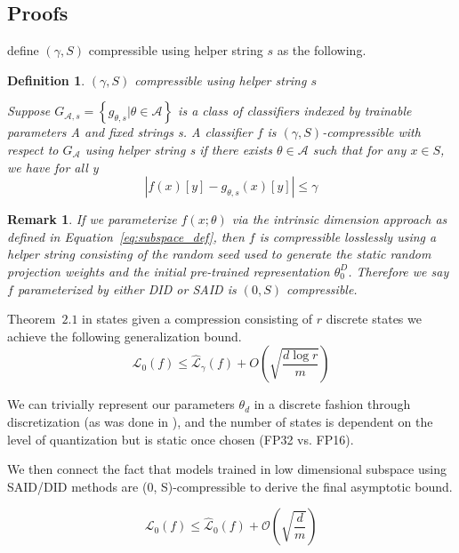 \documentclass{article} \usepackage{iclr2020_conference,times}
\newtheorem{definition}{Definition}
\newtheorem{remark}{Remark}
\begin{document}
\subsection{Proofs}
\label{sec:proofs}
\cite{compression_generalization_gap} define $(\gamma, S)$ compressible using helper string $s$ as the following.
\begin{definition}
$(\gamma, S)$ compressible using helper string $s$ 

Suppose $G_{\mathcal{A},s}= \left\{g_{\theta,s}|\theta \in \mathcal{A}\right\}$ is a class of
classifiers indexed by trainable parameters A and fixed strings s. A classifier $f$ is $(\gamma, S)$-compressible
with respect to $G_{\mathcal{A}}$ using helper string s if there exists $\theta \in \mathcal{A}$ such that for any $x \in S$, we have
for all y
\begin{equation}
|f(x)[y] - g_{\theta,s}(x)[y]| \leq \gamma 
\end{equation}
\end{definition}
\begin{remark}
If we parameterize $f(x; \theta)$ via the intrinsic dimension approach as defined in Equation~\ref{eq:subspace_def}, then $f$ is compressible losslessly using a helper string consisting of the random seed used to generate the static random projection weights and the initial pre-trained representation $\theta^D_0$. Therefore we say $f$ parameterized by either DID or SAID is $\left(0, S\right)$ compressible.
\end{remark}
Theorem~$2.1$ in \cite{compression_generalization_gap} states given a compression consisting of $r$ discrete states we achieve the following generalization bound.
\begin{equation}
    \mathcal{L}_{0}(f) \leq \hat{\mathcal{L}}_{\gamma}(f) + O\left(\sqrt{\frac{d \log{r}}{m}}\right)
\end{equation}

We can trivially represent our parameters $\theta_d$ in a discrete fashion through discretization (as was done in \cite{compression_generalization_gap}), and the number of states is dependent on the level of quantization but is static once chosen (FP32 vs. FP16).

We then connect the fact that models trained in low dimensional subspace using SAID/DID methods are (0, S)-compressible to derive the final asymptotic bound.

\begin{equation}
    \mathcal{L}_{0}(f) \leq \hat{\mathcal{L}}_{0}(f) + \mathcal{O}\left(\sqrt{\frac{d}{m}}\right)
\end{equation}
\end{document}

